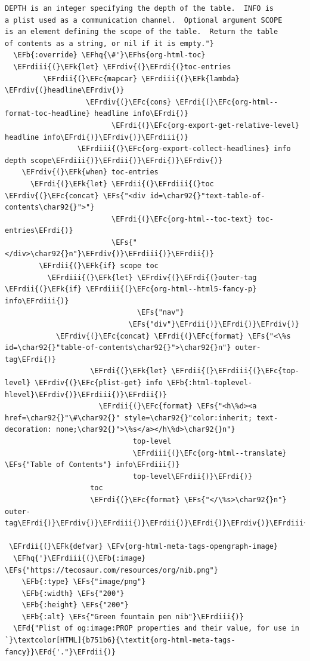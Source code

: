 \documentclass{scrartcl}
\newcommand{\EFk}[1]{\textcolor{EFk}{#1}} %
\newcommand{\EFd}[1]{\textcolor{EFd}{\textit{#1}}} %
\newcommand{\EFs}[1]{\textcolor{EFs}{#1}} %
\newcommand{\EFb}[1]{\textcolor{EFb}{#1}} %
\newcommand{\EFc}[1]{\textcolor{EFc}{#1}} %
\newcommand{\EFv}[1]{\textcolor{EFv}{#1}} %
\newcommand{\EFhq}[1]{\textcolor{EFhq}{#1}} %
\newcommand{\EFhs}[1]{\textcolor{EFhs}{#1}} %
\newcommand{\EFrdi}[1]{\textcolor{EFrdi}{#1}} %
\newcommand{\EFrdii}[1]{\textcolor{EFrdii}{#1}} %
\newcommand{\EFrdiii}[1]{\textcolor{EFrdiii}{#1}} %
\newcommand{\EFrdiv}[1]{\textcolor{EFrdiv}{#1}} %
\begin{document}
\begin{Code}
\begin{Verbatim}[]
DEPTH is an integer specifying the depth of the table.  INFO is
a plist used as a communication channel.  Optional argument SCOPE
is an element defining the scope of the table.  Return the table
of contents as a string, or nil if it is empty."}
  \EFb{:override} \EFhq{\#'}\EFhs{org-html-toc}
  \EFrdiii{(}\EFk{let} \EFrdiv{(}\EFrdi{(}toc-entries
         \EFrdii{(}\EFc{mapcar} \EFrdiii{(}\EFk{lambda} \EFrdiv{(}headline\EFrdiv{)}
                   \EFrdiv{(}\EFc{cons} \EFrdi{(}\EFc{org-html--format-toc-headline} headline info\EFrdi{)}
                         \EFrdi{(}\EFc{org-export-get-relative-level} headline info\EFrdi{)}\EFrdiv{)}\EFrdiii{)}
                 \EFrdiii{(}\EFc{org-export-collect-headlines} info depth scope\EFrdiii{)}\EFrdii{)}\EFrdi{)}\EFrdiv{)}
    \EFrdiv{(}\EFk{when} toc-entries
      \EFrdi{(}\EFk{let} \EFrdii{(}\EFrdiii{(}toc \EFrdiv{(}\EFc{concat} \EFs{"<div id=\char92{}"text-table-of-contents\char92{}">"}
                         \EFrdi{(}\EFc{org-html--toc-text} toc-entries\EFrdi{)}
                         \EFs{"</div>\char92{}n"}\EFrdiv{)}\EFrdiii{)}\EFrdii{)}
        \EFrdii{(}\EFk{if} scope toc
          \EFrdiii{(}\EFk{let} \EFrdiv{(}\EFrdi{(}outer-tag \EFrdii{(}\EFk{if} \EFrdiii{(}\EFc{org-html--html5-fancy-p} info\EFrdiii{)}
                               \EFs{"nav"}
                             \EFs{"div"}\EFrdii{)}\EFrdi{)}\EFrdiv{)}
            \EFrdiv{(}\EFc{concat} \EFrdi{(}\EFc{format} \EFs{"<\%s id=\char92{}"table-of-contents\char92{}">\char92{}n"} outer-tag\EFrdi{)}
                    \EFrdi{(}\EFk{let} \EFrdii{(}\EFrdiii{(}\EFc{top-level} \EFrdiv{(}\EFc{plist-get} info \EFb{:html-toplevel-hlevel}\EFrdiv{)}\EFrdiii{)}\EFrdii{)}
                      \EFrdii{(}\EFc{format} \EFs{"<h\%d><a href=\char92{}"\#\char92{}" style=\char92{}"color:inherit; text-decoration: none;\char92{}">\%s</a></h\%d>\char92{}n"}
                              top-level
                              \EFrdiii{(}\EFc{org-html--translate} \EFs{"Table of Contents"} info\EFrdiii{)}
                              top-level\EFrdii{)}\EFrdi{)}
                    toc
                    \EFrdi{(}\EFc{format} \EFs{"</\%s>\char92{}n"} outer-tag\EFrdi{)}\EFrdiv{)}\EFrdiii{)}\EFrdii{)}\EFrdi{)}\EFrdiv{)}\EFrdiii{)}\EFrdii{)}

 \EFrdii{(}\EFk{defvar} \EFv{org-html-meta-tags-opengraph-image}
  \EFhq{'}\EFrdiii{(}\EFb{:image} \EFs{"https://tecosaur.com/resources/org/nib.png"}
    \EFb{:type} \EFs{"image/png"}
    \EFb{:width} \EFs{"200"}
    \EFb{:height} \EFs{"200"}
    \EFb{:alt} \EFs{"Green fountain pen nib"}\EFrdiii{)}
  \EFd{"Plist of og:image:PROP properties and their value, for use in `}\textcolor[HTML]{b751b6}{\textit{org-html-meta-tags-fancy}}\EFd{'."}\EFrdii{)}


\end{Verbatim}
\end{Code}
\end{document}
